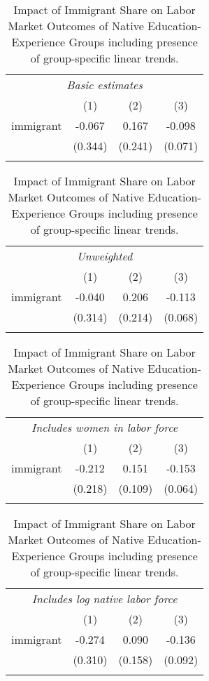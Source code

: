 \begin{table}[H]
\caption{\label{tab:table2}Impact of Immigrant Share on Labor Market Outcomes of Native Education-Experience Groups including presence of group-specific linear trends.}
\begin{center}
\def\sym#1{\ifmmode^{#1}\else\(^{#1}\)\fi} 
\begin{tabular}{lccc}
\multicolumn{4}{c}{\textit{Basic estimates}}\\
                    &\multicolumn{1}{c}{(1)}&\multicolumn{1}{c}{(2)}&\multicolumn{1}{c}{(3)}\\
\midrule
immigrant    &      -0.067&       0.167&      -0.098\\
                    &     (0.344)&     (0.241)&     (0.071)\\
\vspace{0.3mm}\\ \hline \end{tabular}        

\def\sym#1{\ifmmode^{#1}\else\(^{#1}\)\fi} 
\begin{tabular}{lccc}
\multicolumn{4}{c}{\textit{Unweighted}}\\
                    &\multicolumn{1}{c}{(1)}&\multicolumn{1}{c}{(2)}&\multicolumn{1}{c}{(3)}\\
\midrule
immigrant    &      -0.040&       0.206&      -0.113\\
                    &     (0.314)&     (0.214)&     (0.068)\\
\vspace{0.3mm}\\ \hline \end{tabular}    

\def\sym#1{\ifmmode^{#1}\else\(^{#1}\)\fi} 
\begin{tabular}{lccc}
\multicolumn{4}{c}{\textit{Includes women in labor force}}\\
                    &\multicolumn{1}{c}{(1)}&\multicolumn{1}{c}{(2)}&\multicolumn{1}{c}{(3)}\\
\midrule
immigrant    &      -0.212&       0.151&      -0.153\\
                    &     (0.218)&     (0.109)&     (0.064)\\
\vspace{0.3mm}\\ \hline \end{tabular}   

\def\sym#1{\ifmmode^{#1}\else\(^{#1}\)\fi} 
\begin{tabular}{lccc}
\multicolumn{4}{c}{\textit{Includes log native labor force}}\\
                    &\multicolumn{1}{c}{(1)}&\multicolumn{1}{c}{(2)}&\multicolumn{1}{c}{(3)}\\
\midrule
immigrant    &      -0.274&       0.090&      -0.136\\
                    &     (0.310)&     (0.158)&     (0.092)\\
\vspace{0.3mm}\\ \hline \hline \end{tabular}       


\end{center}
\end{table}
